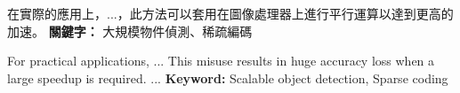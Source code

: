 \begin{abstractzh}

在實際的應用上，...，此方法可以套用在圖像處理器上進行平行運算以達到更高的加速。
{\bf 關鍵字：} 大規模物件偵測、稀疏編碼

\end{abstractzh}

\begin{abstracten}
	
For practical applications, ... This misuse results in huge accuracy loss when a large speedup is required. ...
{\bf Keyword:} Scalable object detection, Sparse coding

\end{abstracten}

